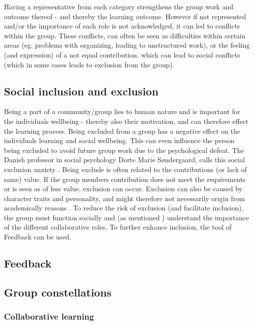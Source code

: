 Having a representative from each category strengthens the group work and outcome thereof - and thereby the learning outcome\cite{ProjektarbejdesKompleksitet}. However if not represented and/or the importance of each role is not acknowledged, it can led to conflicts within the group. These conflicts, can often be seen as difficulties within certain areas (eg. problems with organizing, leading to unstructured work), or the feeling (and expression) of a not equal contribution, which can lead to social conflicts (which in some cases leads to exclusion from the group)\cite{ProjektarbejdesKompleksitet}. 

\subsection{Social inclusion and exclusion}
Being a part of a community/group lies to human nature and is important for the individuals wellbeing  \cite{ProjektarbejdesKompleksitet}- thereby also their motivation, and can therefore effect the learning process. Being excluded from a group has a negative effect on the individuals learning and social wellbeing. This can even influence the person being excluded to avoid future group work due to the psychological defeat.   The Danish professor in social psychology Dorte Marie Søndergaard, calls this  social exclusion anxiety \cite{ProjektarbejdesKompleksitet}. Being exclude is often related to the contributions (or lack of same) value. If the group members contribution does not meet the requirements or is seen as of less value, exclusion can occur. Exclusion can also be caused by character traits and personality, and might therefore not necessarily origin from academically reasons \cite{ProjektarbejdesKompleksitet}.
To reduce the risk of exclusion (and facilitate inclusion), the group must function socially and (as mentioned ) understand the importance of the different collaborative roles. To further enhance inclusion, the tool of Feedback can be used. 

\subsection{Feedback}


\subsection{Group constellations}

\subsubsection{Collaborative learning}

